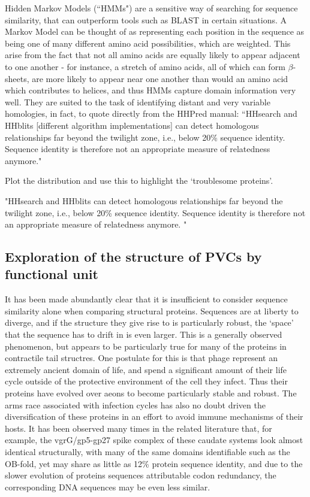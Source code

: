 Hidden Markov Models (``HMMs") are a sensitive way of searching for sequence similarity, that can outperform tools such as BLAST in certain situations. A Markov Model can be thought of as representing each position in the sequence as being one of many different amino acid possibilities, which are weighted. This arise from the fact that not all amino acids are equally likely to appear adjacent to one another - for instance, a stretch of amino acids, all of which can form $\beta$-sheets, are more likely to appear near one another than would an amino acid which contributes to helices, and thus HMMs capture domain information very well. They are suited to the task of identifying distant and very variable homologies, in fact, to quote directly from the HHPred manual: ``HHsearch and HHblits [different algorithm implementations] can detect homologous relationships far beyond the twilight zone, i.e., below 20\% sequence identity. Sequence identity is therefore not an appropriate measure of relatedness anymore."

	
Plot the distribution and use this to highlight the `troublesome proteins'.


"HHsearch and HHblits can detect homologous relationships far
beyond the twilight zone, i.e., below 20\% sequence identity. Sequence identity is therefore not an
appropriate measure of relatedness anymore. "
	
\subsection{Exploration of the structure of PVCs by functional unit}
It has been made abundantly clear that it is insufficient to consider sequence similarity alone when comparing structural proteins. Sequences are at liberty to diverge, and if the structure they give rise to is particularly robust, the `space' that the sequence has to drift in is even larger. This is a generally observed phenomenon, but appears to be particularly true for many of the proteins in contractile tail structres. One postulate for this is that phage represent an extremely ancient domain of life, and spend a significant amount of their life cycle outside of the protective environment of the cell they infect. Thus their proteins have evolved over aeons to become particularly stable and robust. The arms race associated with infection cycles has also no doubt driven the diversification of these proteins in an effort to avoid immune mechanisms of their hosts. It has been observed many times in the related literature that, for example, the vgrG/gp5-gp27 spike complex of these caudate systems look almost identical structurally, with many of the same domains identifiable such as the OB-fold, yet may share as little as 12\% protein sequence identity, and due to the slower evolution of proteins sequences attributable codon redundancy, the corresponding DNA sequences may be even less similar.

